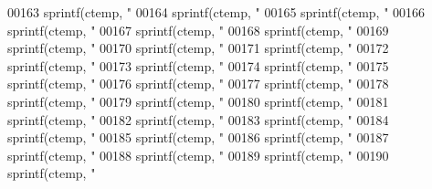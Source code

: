 \begin{DoxyCode}
{{{{{{{{{{{{{{{{{{{{{{{00163     sprintf(ctemp, \textcolor{stringliteral}{"%
00164     sprintf(ctemp, \textcolor{stringliteral}{"%
00165     sprintf(ctemp, \textcolor{stringliteral}{"%
00166     sprintf(ctemp, \textcolor{stringliteral}{"%
00167     sprintf(ctemp, \textcolor{stringliteral}{"%
00168     sprintf(ctemp, \textcolor{stringliteral}{"%
00169     sprintf(ctemp, \textcolor{stringliteral}{"%
00170     sprintf(ctemp, \textcolor{stringliteral}{"%
00171     sprintf(ctemp, \textcolor{stringliteral}{"%
00172     sprintf(ctemp, \textcolor{stringliteral}{"%
00173     sprintf(ctemp, \textcolor{stringliteral}{"%
00174     sprintf(ctemp, \textcolor{stringliteral}{"%
00175     sprintf(ctemp, \textcolor{stringliteral}{"%
00176     sprintf(ctemp, \textcolor{stringliteral}{"%
00177     sprintf(ctemp, \textcolor{stringliteral}{"%
00178     sprintf(ctemp, \textcolor{stringliteral}{"%
00179     sprintf(ctemp, \textcolor{stringliteral}{"%
00180     sprintf(ctemp, \textcolor{stringliteral}{"%
00181     sprintf(ctemp, \textcolor{stringliteral}{"%
00182     sprintf(ctemp, \textcolor{stringliteral}{"%
00183     sprintf(ctemp, \textcolor{stringliteral}{"%
00184     sprintf(ctemp, \textcolor{stringliteral}{"%
00185     sprintf(ctemp, \textcolor{stringliteral}{"%
00186     sprintf(ctemp, \textcolor{stringliteral}{"%
00187     sprintf(ctemp, \textcolor{stringliteral}{"%
00188     sprintf(ctemp, \textcolor{stringliteral}{"%
00189     sprintf(ctemp, \textcolor{stringliteral}{"%
00190     sprintf(ctemp, \textcolor{stringliteral}{"%
}}}}}}}}}}}}}}}}}}}}}}}}}}}}}}}}}}}}}}}}}}}}}}}}}}}
\end{DoxyCode}
